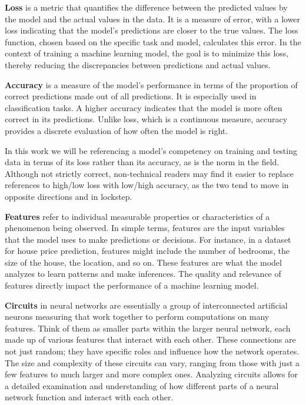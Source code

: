 \documentclass{article}
\begin{document}
\textbf{Loss} is a metric that quantifies the difference between the predicted values by the model and the actual values in the data. 
It is a measure of error, with a lower loss indicating that the model's predictions are closer to the true values. 
The loss function, chosen based on the specific task and model, calculates this error. 
In the context of training a machine learning model, the goal is to minimize this loss, thereby reducing the discrepancies between predictions and actual values.

\textbf{Accuracy} is a measure of the model's performance in terms of the proportion of correct predictions made out of all predictions. 
It is especially used in classification tasks. 
A higher accuracy indicates that the model is more often correct in its predictions. 
Unlike loss, which is a continuous measure, accuracy provides a discrete evaluation of how often the model is right.\par

In this work we will be referencing a model's competency on training and testing data in terms of its loss rather than its accuracy, as is the norm in the field. 
Although not strictly correct, non-technical readers may find it easier to replace references to high/low loss with low/high accuracy, as the two tend to move in opposite directions and in lockstep.\par

\textbf{Features} refer to individual measurable properties or characteristics of a phenomenon being observed. 
In simple terms, features are the input variables that the model uses to make predictions or decisions. 
For instance, in a dataset for house price prediction, features might include the number of bedrooms, the size of the house, the location, and so on. 
These features are what the model analyzes to learn patterns and make inferences. 
The quality and relevance of features directly impact the performance of a machine learning model.\par

\textbf{Circuits} in neural networks are essentially a group of interconnected artificial neurons measuring that work together to perform computations on many features\cite{olah2020zoom}. Think of them as smaller parts within the larger neural network, each made up of various features that interact with each other. 
These connections are not just random; they have specific roles and influence how the network operates. 
The size and complexity of these circuits can vary, ranging from those with just a few features to much larger and more complex ones. 
Analyzing circuits allows for a detailed examination and understanding of how different parts of a neural network function and interact with each other.
\end{document}
